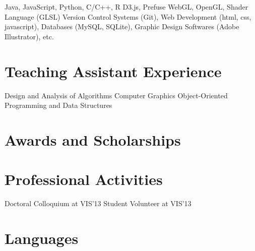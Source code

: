 \documentclass[10pt,a4paper,roman]{moderncv} %
\begin{document}
 {Java, JavaScript, Python, C/C++, R}
 {D3.js, Prefuse}
 {WebGL, OpenGL, Shader Language (GLSL)}
 {Version Control Systems (Git), Web Development (html, css, javascript), Databases (MySQL, SQLite), Graphic Design Softwares (Adobe Illustrator), etc.}



\section{Teaching Assistant Experience}

 {Design and Analysis of Algorithms}
 {Computer Graphics}
 {Object-Oriented Programming and Data Structures}



\section{Awards and Scholarships}



\section{Professional Activities}

 {Doctoral Colloquium at VIS'13}
 {Student Volunteer at VIS'13}



\section{Languages}



\clearpage
\end{document}
